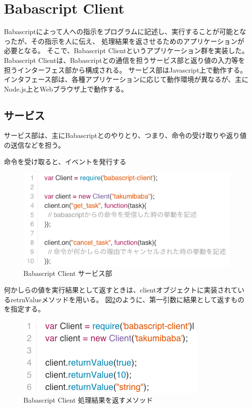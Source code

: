 \section{Babascript Client}\label{babascript-client}

Babascriptによって人への指示をプログラムに記述し、実行することが可能となったが、その指示を人に伝え、
処理結果を返させるためのアプリケーションが必要となる。
そこで、Babascript Clientというアプリケーション群を実装した。 Babascript
Clientは、Babascriptとの通信を担うサービス部と返り値の入力等を担うインターフェス部から構成される。
サービス部はJavascript上で動作する。
インタフェース部は、各種アプリケーションに応じて動作環境が異なるが、主にNode.js上とWebブラウザ上で動作する。

\subsection{サービス}\label{ux30b5ux30fcux30d3ux30b9}

サービス部は、主にBabascriptとのやりとり、つまり、命令の受け取りや返り値の送信などを担う。

命令を受け取ると、イベントを発行する

\begin{figure}[htbp]
  \begin{center}
  \includegraphics[width=.8\linewidth,bb=0 0 560 253]{images/babascript_client_service.js.png}
  \end{center}
  \caption{Babascript Client サービス部}
  \label{fig:babascript_client_service}
\end{figure}

何かしらの値を実行結果として返すときは、clientオブジェクトに実装されているretrnValueメソッドを用いる。
図\ref{fig:babascript_client_service_returnvalue}のように、第一引数に結果として返すものを指定する。

\begin{figure}[htbp]
  \begin{center}
  \includegraphics[width=.8\linewidth,bb=0 0 357 149]{images/babascript_client_service_returnvalue.js.png}
  \end{center}
  \caption{Babascript Client 処理結果を返すメソッド}
  \label{fig:babascript_client_service_returnvalue}
\end{figure}

